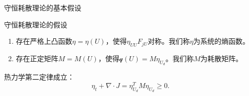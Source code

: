 \documentclass[mathserif]{beamer}
\begin{document}
	\begin{frame}{守恒耗散理论的基本假设}
	\begin{block}{守恒耗散理论的假设}
	\begin{enumerate}
		\pause
		\item 存在严格上凸函数$\eta = \eta (U)$，使得$\eta_{UU} F_{jU}$对称。我们称$\eta$为系统的熵函数。
		\pause
		\item 存在正定矩阵$M = M(U)$，使得$\mathcal{q}(U) = M \eta_{U_d}$。我们称$M$为耗散矩阵。
	\end{enumerate}
	\end{block}
	\pause
	热力学第二定律成立：
	\begin{equation*}
		\eta_t + \nabla \cdot J = \eta_{U_d}^T M \eta_{U_d} \ge 0.
	\end{equation*}
\end{frame}
\end{document}
